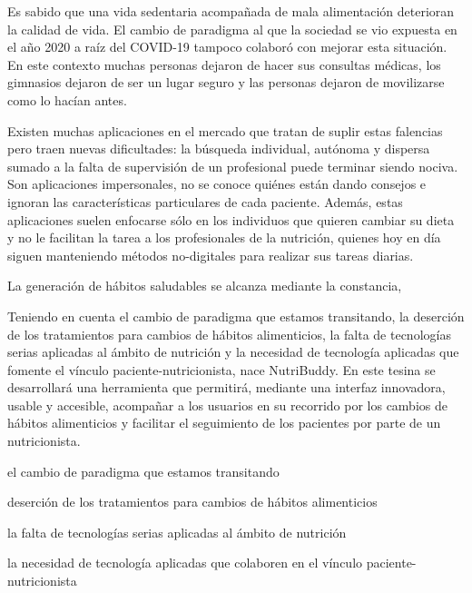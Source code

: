 Es sabido que una vida sedentaria acompañada de mala alimentación deterioran la calidad de vida. El cambio de paradigma al que la sociedad se vio expuesta en el año 2020 a raíz del COVID-19 tampoco colaboró con mejorar esta situación. En este contexto muchas personas dejaron de hacer sus consultas médicas, los gimnasios dejaron de ser un lugar seguro y las personas dejaron de movilizarse como lo hacían antes. 

Existen muchas aplicaciones en el mercado que tratan de suplir estas falencias pero traen nuevas dificultades: la búsqueda individual, autónoma y dispersa sumado a la falta de supervisión de un profesional puede terminar siendo nociva. Son aplicaciones impersonales, no se conoce quiénes están dando consejos e ignoran las características particulares de cada paciente. Además, estas aplicaciones suelen enfocarse sólo en los individuos que quieren cambiar su dieta y no le facilitan la tarea a los profesionales de la nutrición, quienes hoy en día siguen manteniendo métodos no-digitales para realizar sus tareas diarias.

La generación de hábitos saludables se alcanza mediante la constancia,  



Teniendo en cuenta el cambio de paradigma que estamos transitando, la deserción de los tratamientos para cambios de hábitos alimenticios, la falta de tecnologías serias aplicadas al ámbito de nutrición y la necesidad de tecnología aplicadas que fomente el vínculo paciente-nutricionista, nace NutriBuddy. En este tesina se desarrollará una herramienta que permitirá, mediante una interfaz innovadora, usable y accesible, acompañar a los usuarios en su recorrido por los cambios de hábitos alimenticios y facilitar el seguimiento de los pacientes por parte de un nutricionista.


\cite{educacionPrimaria2018}


el cambio de paradigma que estamos transitando

deserción de los tratamientos para cambios de hábitos alimenticios

la falta de tecnologías serias aplicadas al ámbito de nutrición

la necesidad de tecnología aplicadas que colaboren en el vínculo paciente-nutricionista
